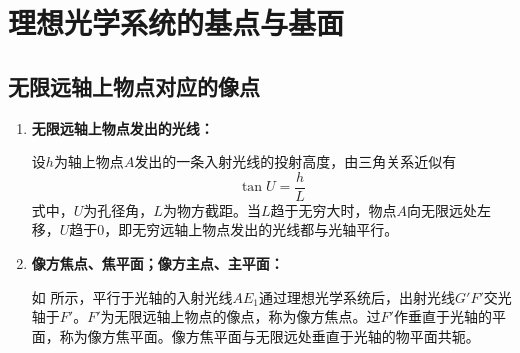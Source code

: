 \documentclass[cn,10pt,chinesefont=founder,math=mtpro2,cite=super,toc=onecol,twoside,openany]{elegantbook}
\begin{document}
\section{理想光学系统的基点与基面}
\subsection{无限远轴上物点对应的像点}
\label{subsect:infty-object}

\begin{enumerate}	
	\item \textbf{无限远轴上物点发出的光线：}
	
	设$h$为轴上物点$A$发出的一条入射光线的投射高度，由三角关系近似有
	\begin{equation}
		\tan U=\frac{h}{L}
	\end{equation}
	式中，$U$为孔径角，$L$为物方截距。当$L$趋于无穷大时，物点$A$向无限远处左移，$U$趋于$0$，即无穷远轴上物点发出的光线都与光轴平行。
	\item \textbf{像方焦点、焦平面；像方主点、主平面：}
	
	如 所示，平行于光轴的入射光线$AE_1$通过理想光学系统后，出射光线$G'F'$交光轴于$F'$。$F'$为无限远轴上物点的像点，称为像方焦点。过$F'$作垂直于光轴的平面，称为像方焦平面。像方焦平面与无限远处垂直于光轴的物平面共轭。


\end{enumerate}
\end{document}
